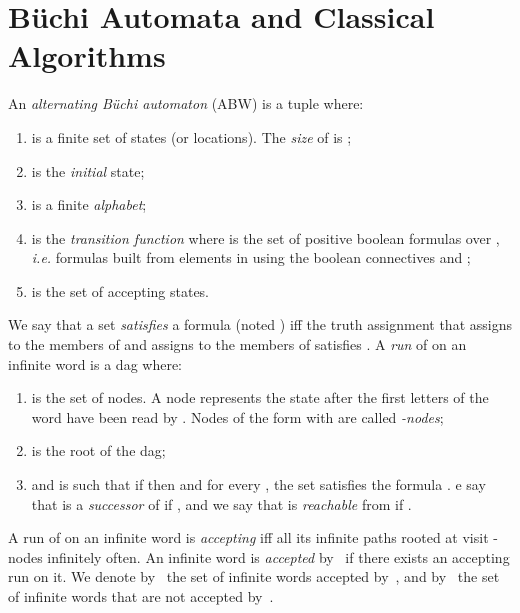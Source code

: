 \documentclass{LMCS}
\newcounter{compressEnum}
\renewcommand{\thecompressEnum}{}
\newenvironment{compressEnum}
{\setcounter{compressEnum}{0}}
\newcommand{\itCompress}{\stepcounter{compressEnum}{(\thecompressEnum) }}
\newcommand{\DAG}{{\sc dag}}
\begin{document}
\section{B\"uchi Automata and Classical Algorithms}\label{sec:definitions}


\begin{defi}\label{def:ABW}
An \emph{alternating B\"uchi automaton} (ABW) is a tuple 
 where: 

\begin{enumerate}[]

\item  is a finite set of states (or locations). 
The \emph{size} of  is ; 

\item  is the \emph{initial} state;

\item  is a finite \emph{alphabet};

\item  is the \emph{transition function} 
where  is the set of positive boolean formulas over , 
{\it i.e.} formulas built from elements in   
using the boolean connectives  and ; 

\item  is the set of accepting states.

\end{enumerate}
\end{defi}












We say that a set  \emph{satisfies} a
formula  (noted ) iff the
truth assignment that assigns  to the members of  and
assigns  to the members of  satisfies
.  A \emph{run} of  on an infinite word  is a \DAG\/  where:

\begin{enumerate}[]

\item  is the set of nodes. A node  represents the
state  after the first  letters of the word  have been read by . 
Nodes of the form  with  are called \emph{-nodes};

\item  is the root of the \DAG;

\item and  is such that \begin{compressEnum} 
\itCompress if  then  and 
\itCompress for every , the set  
satisfies the formula .
\end{compressEnum}
We say that  is a \emph{successor} of  if , 
and we say that  is \emph{reachable} from  if .

\end{enumerate}
\noindent
A run  of  on an infinite word  is
\emph{accepting} iff all its infinite paths  rooted at 
visit -nodes infinitely often.
An infinite word  is \emph{accepted} by~ if
there exists an accepting run on it. We denote by~ the set
of infinite words accepted by~, and by~  the set of infinite words that are not accepted by~.
\end{document}
